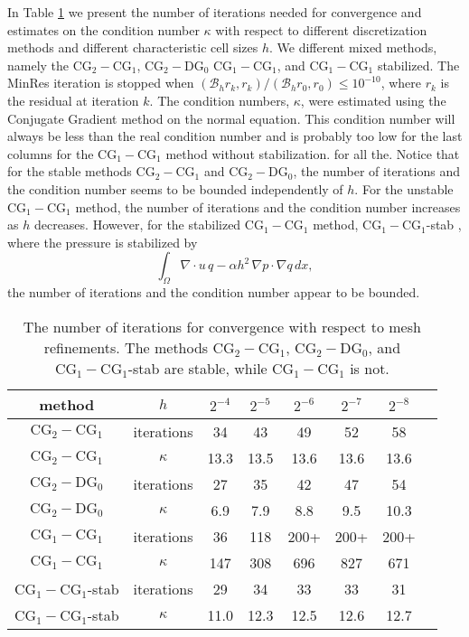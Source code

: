 In Table \ref{stokes:ex} 
we present the number of iterations needed for convergence 
and estimates on the condition number $\kappa$ with 
respect to different discretization methods and different characteristic cell sizes $h$. 
We different mixed methods, namely  the  $\mathrm{CG}_2-\mathrm{CG}_1$, $\mathrm{CG}_2-\mathrm{DG}_0$  
$\mathrm{CG}_1-\mathrm{CG}_1$, and  $\mathrm{CG}_1-\mathrm{CG}_1$ stabilized.  
The MinRes iteration is stopped when 
$(\mathcal{B}_h r_k, r_k)/(\mathcal{B}_h r_0, r_0) \le 10^{-10}$, where $r_k$ is the residual at
iteration $k$. 
The condition numbers, $\kappa$, were estimated using the Conjugate Gradient method on the
normal equation. This condition number will always be less 
than the real condition number and is probably too low
for the last columns for the $\mathrm{CG}_1-\mathrm{CG}_1$ method without stabilization. 
for all the. 
Notice that for the stable methods $\mathrm{CG}_2-\mathrm{CG}_1$ and $\mathrm{CG}_2-\mathrm{DG}_0$,
the number of iterations and the condition number seems to be bounded
independently of $h$. For the unstable $\mathrm{CG}_1-\mathrm{CG}_1$ method, the number of iterations
and the condition number increases as $h$ decreases. However, for 
the stabilized $\mathrm{CG}_1-\mathrm{CG}_1$ method, $\mathrm{CG}_1-\mathrm{CG}_1$-stab , where the pressure is stabilized by 
\[
\int_\Omega \nabla \cdot u \, q  - \alpha h^2 \, \nabla p \cdot \nabla q \, dx,       
\]
the number of iterations and the condition number appear to be bounded. 

\begin{table}
\begin{center}
\begin{tabular}{|c|c||c|c|c|c|c|c|}
\hline
method & $h$ & $2^{-4}$ & $2^{-5}$ & $2^{-6}$ & $2^{-7}$ & $2^{-8}$ \\ \hline\hline
$\mathrm{CG}_2-\mathrm{CG}_1$ &  iterations & 34 & 43 & 49 & 52 & 58 \\ \hline 
$\mathrm{CG}_2-\mathrm{CG}_1$ & $\kappa $ & 13.3 & 13.5 & 13.6 & 13.6 & 13.6 \\ \hline 
$\mathrm{CG}_2-\mathrm{DG}_0$ &  iterations & 27 & 35 & 42 & 47 & 54 \\ \hline 
$\mathrm{CG}_2-\mathrm{DG}_0$ & $\kappa $ & 6.9 & 7.9 & 8.8 & 9.5 & 10.3 \\ \hline 
$\mathrm{CG}_1-\mathrm{CG}_1$ & iterations & 36 & 118 & 200+ & 200+ & 200+ \\ \hline 
$\mathrm{CG}_1-\mathrm{CG}_1$ & $\kappa$ & 147 & 308 & 696 & 827 & 671 \\ \hline 
$\mathrm{CG}_1-\mathrm{CG}_1$-stab& iterations & 29 & 34 & 33 & 33 & 31 \\ \hline 
$\mathrm{CG}_1-\mathrm{CG}_1$-stab& $\kappa $ & 11.0 & 12.3 & 12.5 & 12.6 & 12.7 \\ \hline 
\end{tabular}
\caption{The number of iterations for 
  convergence with respect to mesh refinements.
  The methods $\mathrm{CG}_2-\mathrm{CG}_1$, $\mathrm{CG}_2-\mathrm{DG}_0$, and $\mathrm{CG}_1-\mathrm{CG}_1$-stab are stable, while $\mathrm{CG}_1-\mathrm{CG}_1$ is not.}\label{stokes:ex} 
\end{center}
\end{table}

